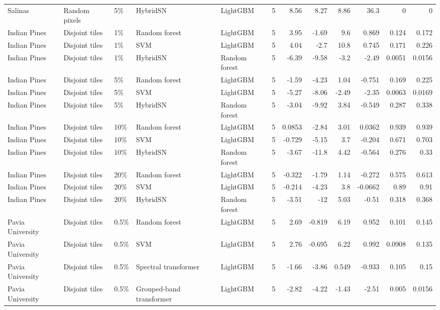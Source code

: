 \begin{table}
\begin{tabular}{lllllrrrrrrr}
Salinas & Random pixels & 5\% & HybridSN & LightGBM & 5 & 8.56 & 8.27 & 8.86 & 36.3 & 0 & 0 \\
Indian Pines & Disjoint tiles & 1\% & Random forest & LightGBM & 5 & 3.95 & -1.69 & 9.6 & 0.869 & 0.124 & 0.172 \\
Indian Pines & Disjoint tiles & 1\% & SVM & LightGBM & 5 & 4.04 & -2.7 & 10.8 & 0.745 & 0.171 & 0.226 \\
Indian Pines & Disjoint tiles & 1\% & HybridSN & Random forest & 5 & -6.39 & -9.58 & -3.2 & -2.49 & 0.0051 & 0.0156 \\
Indian Pines & Disjoint tiles & 5\% & Random forest & LightGBM & 5 & -1.59 & -4.23 & 1.04 & -0.751 & 0.169 & 0.225 \\
Indian Pines & Disjoint tiles & 5\% & SVM & LightGBM & 5 & -5.27 & -8.06 & -2.49 & -2.35 & 0.0063 & 0.0169 \\
Indian Pines & Disjoint tiles & 5\% & HybridSN & Random forest & 5 & -3.04 & -9.92 & 3.84 & -0.549 & 0.287 & 0.338 \\
Indian Pines & Disjoint tiles & 10\% & Random forest & LightGBM & 5 & 0.0853 & -2.84 & 3.01 & 0.0362 & 0.939 & 0.939 \\
Indian Pines & Disjoint tiles & 10\% & SVM & LightGBM & 5 & -0.729 & -5.15 & 3.7 & -0.204 & 0.671 & 0.703 \\
Indian Pines & Disjoint tiles & 10\% & HybridSN & Random forest & 5 & -3.67 & -11.8 & 4.42 & -0.564 & 0.276 & 0.33 \\
Indian Pines & Disjoint tiles & 20\% & Random forest & LightGBM & 5 & -0.322 & -1.79 & 1.14 & -0.272 & 0.575 & 0.613 \\
Indian Pines & Disjoint tiles & 20\% & SVM & LightGBM & 5 & -0.214 & -4.23 & 3.8 & -0.0662 & 0.89 & 0.91 \\
Indian Pines & Disjoint tiles & 20\% & HybridSN & Random forest & 5 & -3.51 & -12 & 5.03 & -0.51 & 0.318 & 0.368 \\
Pavia University & Disjoint tiles & 0.5\% & Random forest & LightGBM & 5 & 2.69 & -0.819 & 6.19 & 0.952 & 0.101 & 0.145 \\
Pavia University & Disjoint tiles & 0.5\% & SVM & LightGBM & 5 & 2.76 & -0.695 & 6.22 & 0.992 & 0.0908 & 0.135 \\
Pavia University & Disjoint tiles & 0.5\% & Spectral transformer & LightGBM & 5 & -1.66 & -3.86 & 0.549 & -0.933 & 0.105 & 0.15 \\
Pavia University & Disjoint tiles & 0.5\% & Grouped-band transformer & LightGBM & 5 & -2.82 & -4.22 & -1.43 & -2.51 & 0.005 & 0.0156 \\

\end{tabular}
\end{table}
